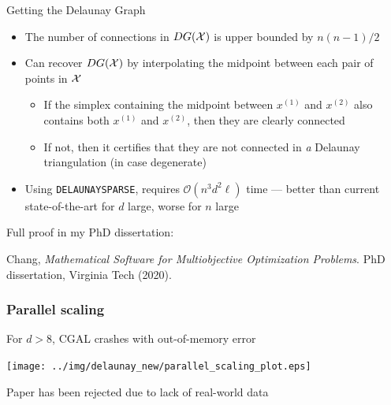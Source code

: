 \documentclass[aspectratio=169]{beamer}
\begin{document}
\begin{frame}{Getting the Delaunay Graph}
\begin{itemize}
\item The number of connections in $DG({\cal X})$ is upper bounded by $n(n-1)/2$
\item Can recover $DG({\cal X})$ by interpolating the midpoint between each
pair of points in ${\cal X}$
\begin{itemize}
\item If the simplex containing the midpoint between $x^{(1)}$ and $x^{(2)}$
also contains both $x^{(1)}$ and $x^{(2)}$, then they are clearly connected
\item If not, then it certifies that they are not connected in {\it a}
Delaunay triangulation (in case degenerate)
\end{itemize}
\item Using {\tt DELAUNAYSPARSE}, requires
$\mathcal{O}(n^3 d^2 \ell)$ time --- better than current state-of-the-art for
$d$ large, worse for $n$ large
\end{itemize}

\vfill

{\tiny Full proof in my PhD dissertation:

Chang, {\sl Mathematical Software for Multiobjective Optimization Problems}.
PhD dissertation, Virginia Tech (2020).
}
\end{frame}

\begin{frame}
\frametitle{Parallel scaling}

For $d>8$, CGAL crashes with out-of-memory error

\begin{center}
\texttt{[image: ../img/delaunay\_new/parallel\_scaling\_plot.eps]}
\end{center}

\vfill

\pause Paper has been rejected due to lack of real-world data
\end{frame}
\end{document}
